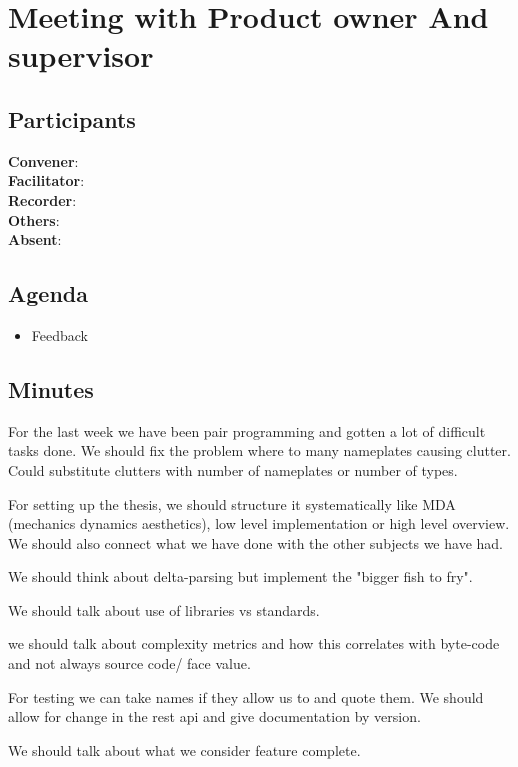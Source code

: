 \section*{Meeting with Product owner And supervisor}
\subsection*{Participants}
\textbf{Convener}: \productowner{}\\
\textbf{Facilitator}: \facilitator{}  \\
\textbf{Recorder}: \scrummaster{}  \\
\textbf{Others}: \groupleader{} \\
\textbf{Absent}: 

\subsection*{Agenda}
\begin{itemize}
    \item Feedback
\end{itemize}

\subsection*{Minutes}
For the last week we have been pair programming and gotten a lot of difficult tasks done. 
We should fix the problem where to many nameplates causing clutter. Could substitute clutters with number of nameplates or number of types. 

For setting up the thesis, we should structure it systematically like MDA (mechanics dynamics aesthetics), low level implementation or high level overview. We should also connect what we have done with the other subjects we have had.

We should think about delta-parsing but implement the "bigger fish to fry". 

We should talk about use of libraries vs standards. 

we should talk about complexity metrics and how this correlates with byte-code and not always source code/ face value.

For testing we can take names if they allow us to and quote them. 
We should allow for change in the rest api and give documentation by version.

We should talk about what we consider feature complete.
\newpage